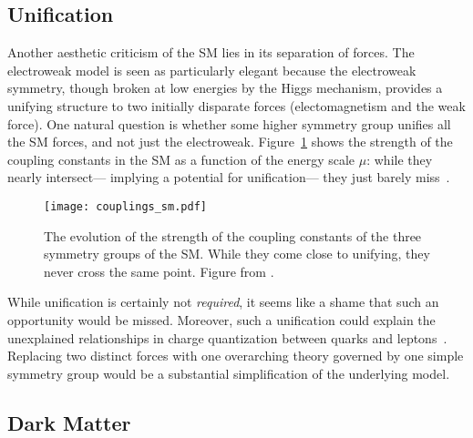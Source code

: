 \subsection{Unification}

Another aesthetic criticism of the SM lies in its separation of forces. The electroweak model is seen as particularly elegant because the electroweak symmetry, though broken at low energies by the Higgs mechanism, provides a unifying structure to two initially disparate forces (electomagnetism and the weak force). One natural question is whether some higher symmetry group unifies all the SM forces, and not just the electroweak. Figure~\ref{fig:susy:couplings_sm} shows the strength of the coupling constants in the SM as a function of the energy scale $\mu$: while they nearly intersect--- implying a potential for unification--- they just barely miss~\cite{susypheno}.



\begin{figure}
\centering
\texttt{[image: couplings\_sm.pdf]}
\caption{The evolution of the strength of the coupling constants of the three symmetry groups of the SM. While they come close to unifying, they never cross the same point. Figure from \cite{susypheno}.}
\label{fig:susy:couplings_sm}
\end{figure}


While unification is certainly not \textit{required}, it seems like a shame that such an opportunity would be missed. Moreover, such a unification could explain the unexplained relationships in charge quantization between quarks and leptons~\cite{SUSYUnification}. Replacing two distinct forces with one overarching theory governed by one simple symmetry group would be a substantial simplification of the underlying model.

\subsection{Dark Matter}


